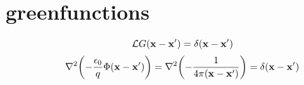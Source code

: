 \section*{greenfunctions}
\[\mathcal{L}G(\vb{x}-\vb{x}')=\delta(\vb{x}-\vb{x}')\]
\[\laplacian\qty(-\frac{\epsilon_0}{q}\Phi(\vb{x}-\vb{x}'))=\laplacian\qty(-\frac{1}{4\pi(\vb{x}-\vb{x}')})=\delta(\vb{x}-\vb{x}')\]
